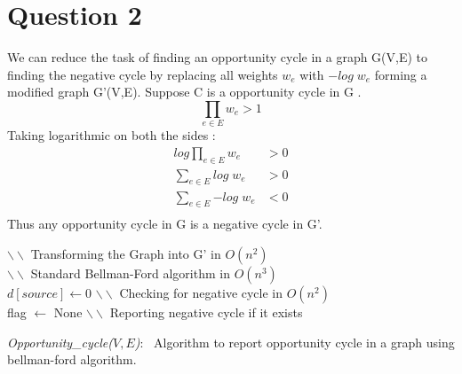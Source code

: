 \documentclass[11pt]{article}
\begin{document}
\section*{Question 2}
We can reduce the task of finding an opportunity cycle in a graph G(V,E) to finding the negative cycle by replacing all weights $w_e$ with $-log \; w_e$
forming a modified graph G'(V,E). Suppose C is a opportunity cycle in G . 
\[ \prod_{e \in E} {w_e} > 1 \]
Taking logarithmic on both the sides :
\begin{align*}
log \prod_{e \in E} {w_e} &> 0 \\
\sum_{e \in E} {log \; w_e} &> 0 \\
\sum_{e \in E} {-log \; w_e} &< 0 \\
\end{align*}
Thus any opportunity cycle in G is a negative cycle in G'. 
\linesnumbered
\begin{algorithm}[h]
$\backslash \backslash$ Transforming the Graph into G' in $O(n^2)$ \\
$\backslash \backslash$ Standard Bellman-Ford algorithm  in $O(n^3)$ \\
$d[source]\leftarrow 0$\;
$\backslash \backslash$ Checking for negative cycle in $O(n^2)$ \\
flag $\leftarrow$ None \;
$\backslash \backslash$ Reporting negative cycle if it exists \\
\caption{{\em Opportunity\_cycle($V,E$)}:~
Algorithm to report opportunity cycle in a graph using bellman-ford algorithm.
}
\label{Bellman-final}
\end{algorithm}
\end{document}
